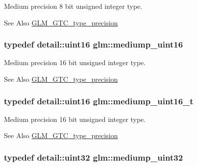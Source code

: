 Medium precision 8 bit unsigned integer type. \begin{DoxySeeAlso}{See Also}
\hyperlink{group__gtc__type__precision}{G\-L\-M\-\_\-\-G\-T\-C\-\_\-type\-\_\-precision} 
\end{DoxySeeAlso}
\hypertarget{group__gtc__type__precision_ga2cef3a0d7b0fce75c9885f64656d8933}{
\subsubsection[{mediump\-\_\-uint16}]{\setlength{\rightskip}{0pt plus 5cm}typedef detail\-::uint16 {\bf glm\-::mediump\-\_\-uint16}}}\label{group__gtc__type__precision_ga2cef3a0d7b0fce75c9885f64656d8933}
Medium precision 16 bit unsigned integer type. \begin{DoxySeeAlso}{See Also}
\hyperlink{group__gtc__type__precision}{G\-L\-M\-\_\-\-G\-T\-C\-\_\-type\-\_\-precision} 
\end{DoxySeeAlso}
\hypertarget{group__gtc__type__precision_ga0b385466deac5ac96061ef2cdd6db20f}{
\subsubsection[{mediump\-\_\-uint16\-\_\-t}]{\setlength{\rightskip}{0pt plus 5cm}typedef detail\-::uint16 {\bf glm\-::mediump\-\_\-uint16\-\_\-t}}}\label{group__gtc__type__precision_ga0b385466deac5ac96061ef2cdd6db20f}
Medium precision 16 bit unsigned integer type. \begin{DoxySeeAlso}{See Also}
\hyperlink{group__gtc__type__precision}{G\-L\-M\-\_\-\-G\-T\-C\-\_\-type\-\_\-precision} 
\end{DoxySeeAlso}
\hypertarget{group__gtc__type__precision_ga861dbd1051f488e425b3966001b568e5}{
\subsubsection[{mediump\-\_\-uint32}]{\setlength{\rightskip}{0pt plus 5cm}typedef detail\-::uint32 {\bf glm\-::mediump\-\_\-uint32}}}\label{group__gtc__type__precision_ga861dbd1051f488e425b3966001b568e5}
